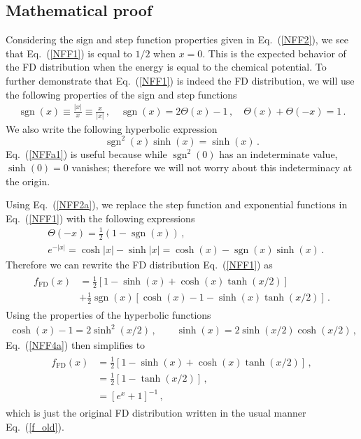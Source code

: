 \documentclass[sn-mathphys,Numbered]{sn-jnl}
\newcommand{\req}[1]{Eq.~(\ref{#1})}
\DeclareMathOperator{\sgn}{sgn}
\begin{document}
\subsection{Mathematical proof}
\label{Proof}
Considering the sign and step function properties given in \req{NFF2}, we see that \req{NFF1} is equal to $1/2$ when $x=0$. This is the expected behavior of the FD distribution when the energy is equal to the chemical potential. To further demonstrate that \req{NFF1} is indeed the FD distribution, we will use the following properties of the sign and step functions
\begin{align}
\label{NFF2a}
\sgn(x)\equiv\frac{|x|}{x}\equiv\frac{x}{|x|}\,,\quad
\sgn(x)=2\Theta(x)-1\,,\quad
\Theta(x)+\Theta(-x)=1\,.
\end{align}
We also write the following hyperbolic expression
\begin{equation}
\label{NFFa1}
\sgn^{2}(x)\sinh(x)=\sinh(x)\,.
\end{equation}
\req{NFFa1} is useful because while $\sgn^{2}(0)$ has an indeterminate value, $\sinh(0)=0$ vanishes; therefore we will not worry about this indeterminacy at the origin.

Using \req{NFF2a}, we replace the step function and exponential functions in \req{NFF1} with the following expressions
\begin{align}
\label{NFF4}
&\Theta(-x)=\frac 1 2 (1-\sgn(x))\,,\\ 
&e^{-|x|}=\cosh|x|-\sinh|x|=\cosh(x)- \sgn(x)\sinh(x)\,.
\end{align}
Therefore we can rewrite the FD distribution \req{NFF1} as
\begin{align}
\begin{split}
\label{NFF4a}
f_\mathrm{FD}(x)&=\frac{1}{2}\left[1-\sinh(x)+\cosh(x)\tanh(x/2)\right]\\
&+\frac{1}{2}\sgn(x)\left[\cosh(x)-1-\sinh(x)\tanh(x/2)\right]\,.
\end{split}
\end{align}
Using the properties of the hyperbolic functions
\begin{align}
\cosh(x)-1=2\sinh^2(x/2)\,,\qquad
\sinh(x)=2\sinh(x/2)\cosh(x/2)\,,
\end{align}
\req{NFF4a} then simplifies to
\begin{align}
\begin{split}
\label{NFF4b}
f_\mathrm{FD}(x)
&=\frac{1}{2}\left[1-\sinh(x)+\cosh(x)\tanh(x/2)\right]\,,\\
&=\frac{1}{2}\left[1-\tanh(x/2)\right]\,,\\
&=\left[e^{x}+1\right]^{-1}\,,
\end{split}
\end{align}
which is just the original FD distribution written in the usual manner \req{f_old}.
\end{document}
